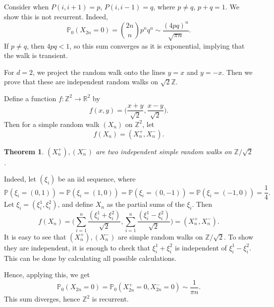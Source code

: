 \documentclass[12pt]{article}
\newtheorem{theorem}{Theorem}[section]
\theoremstyle{definition}
\theoremstyle{remark}
\begin{document}
\begin{adjustbox}{minipage = \columnwidth - 25.5pt, margin=1em, frame=1pt, margin=0em}
	Consider when $P(i, i+1) = p$, $P(i, i-1) = q$, where $p \neq q$, $p + q = 1$. We show this is not recurrent. Indeed,
	\[
		\mathbb{P}_0(X_{2n} = 0) = \binom{2n}{n} p^{n}q^{n} \sim \frac{(4pq)^{n}}{\sqrt{\pi n}}
	.\]
	If $p \neq q$, then $4pq < 1$, so this sum converges as it is exponential, implying that the walk is transient.

	For $d = 2$, we project the random walk onto the lines $y = x$ and $y = -x$. Then we prove that these are independent random walks on $\sqrt{2} \mathbb{Z}$.

	Define a function $f : \mathbb{Z}^2 \to \mathbb{R}^2$ by
	\[
		f(x, y) = \biggl( \frac{x + y}{\sqrt 2}, \frac{x - y}{\sqrt 2} \biggr)
	.\]
	Then for a simple random walk $(X_n)$ on $\mathbb{Z}^2$, let
	\[
		f(X_n) = (X_n^{+}, X_n^{-})
	.\]

\begin{theorem}
	$(X_{n}^{+}), (X_{n}^{-})$ are two independent simple random walks on $\mathbb{Z}/\sqrt 2$.
\end{theorem}

Indeed, let $(\xi_i)$ be an iid sequence, where
\[
	\mathbb{P}(\xi_i = (0, 1)) = \mathbb{P}(\xi_i = (1, 0)) = \mathbb{P}(\xi_i = (0, -1)) = \mathbb{P}(\xi_i = (-1, 0)) = \frac{1}{4}
.\]
Let $\xi_i = (\xi_i^{1}, \xi_i^{2})$, and define $X_n$ as the partial sums of the $\xi_i$. Then
\[
	f(X_n) = \Biggl( \sum_{i = 1}^{n} \frac{(\xi_i^{1} + \xi_i^{2})}{\sqrt 2}, \sum_{i = 1}^{n} \frac{(\xi_i^{1} - \xi_i^{2})}{\sqrt 2} \Biggr) = (X_{n}^{+}, X_{n}^{-})
.\]
It is easy to see that $(X_n^{+}), (X_{n}^{-})$ are simple random walks on $\mathbb{Z}/\sqrt 2$. To show they are independent, it is enough to check that $\xi_i^{1} + \xi_i^{2}$ is independent of $\xi_i^{1} - \xi_i^{2}$. This can be done by calculating all possible calculations.

Hence, applying this, we get
\[
	\mathbb{P}_0(X_{2n} = 0) = \mathbb{P}_0(X_{2n}^{+} = 0, X_{2n}^{-} = 0) \sim \frac{1}{\pi n}
.\]
This sum diverges, hence $\mathbb{Z}^2$ is recurrent.

\end{adjustbox}



\newpage

\printindex
\end{document}
